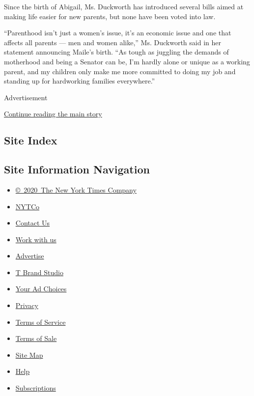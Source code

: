 Since the birth of Abigail, Ms. Duckworth has introduced several bills
aimed at making life easier for new parents, but none have been voted
into law.

``Parenthood isn't just a women's issue, it's an economic issue and one
that affects all parents --- men and women alike,'' Ms. Duckworth said
in her statement announcing Maile's birth. ``As tough as juggling the
demands of motherhood and being a Senator can be, I'm hardly alone or
unique as a working parent, and my children only make me more committed
to doing my job and standing up for hardworking families everywhere.''

Advertisement

\protect\hyperlink{after-bottom}{Continue reading the main story}

\hypertarget{site-index}{%
\subsection{Site Index}\label{site-index}}

\hypertarget{site-information-navigation}{%
\subsection{Site Information
Navigation}\label{site-information-navigation}}

\begin{itemize}
\tightlist
\item
  \href{https://help.nytimes.com/hc/en-us/articles/115014792127-Copyright-notice}{©~2020~The
  New York Times Company}
\end{itemize}

\begin{itemize}
\tightlist
\item
  \href{https://www.nytco.com/}{NYTCo}
\item
  \href{https://help.nytimes.com/hc/en-us/articles/115015385887-Contact-Us}{Contact
  Us}
\item
  \href{https://www.nytco.com/careers/}{Work with us}
\item
  \href{https://nytmediakit.com/}{Advertise}
\item
  \href{http://www.tbrandstudio.com/}{T Brand Studio}
\item
  \href{https://www.nytimes.com/privacy/cookie-policy\#how-do-i-manage-trackers}{Your
  Ad Choices}
\item
  \href{https://www.nytimes.com/privacy}{Privacy}
\item
  \href{https://help.nytimes.com/hc/en-us/articles/115014893428-Terms-of-service}{Terms
  of Service}
\item
  \href{https://help.nytimes.com/hc/en-us/articles/115014893968-Terms-of-sale}{Terms
  of Sale}
\item
  \href{https://spiderbites.nytimes.com}{Site Map}
\item
  \href{https://help.nytimes.com/hc/en-us}{Help}
\item
  \href{https://www.nytimes.com/subscription?campaignId=37WXW}{Subscriptions}
\end{itemize}
